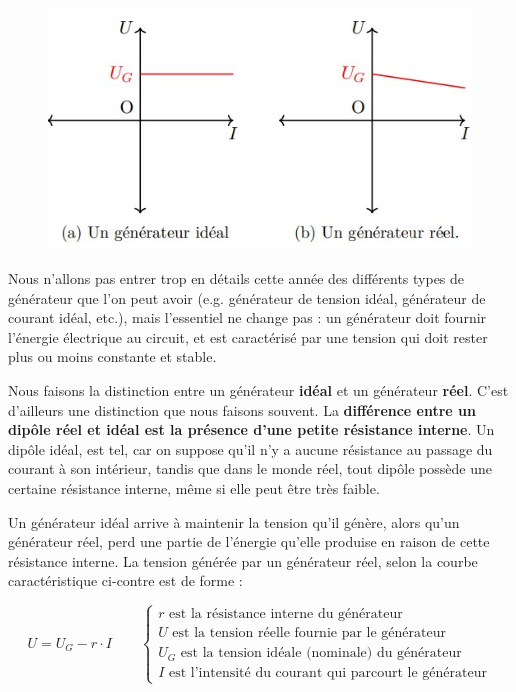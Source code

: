 \documentclass[11pt,a4paper]{article}
\begin{document}
\begin{figure}
\centering
    \includegraphics[width=0.95\linewidth]{imgs/p7/car2.jpg}
\end{figure}
Nous n'allons pas entrer trop en détails cette année des différents types de générateur que l'on peut avoir (e.g. générateur de tension idéal, générateur de courant idéal, etc.), mais l'essentiel ne change pas : un générateur doit fournir l'énergie électrique au circuit, et est caractérisé par une tension qui doit rester plus ou moins constante et stable. 


Nous faisons la distinction entre un générateur \textbf{idéal} et un générateur \textbf{réel}. C'est d'ailleurs une distinction que nous faisons souvent. La \textbf{différence entre un dipôle réel et idéal est la présence d'une petite résistance interne}. Un dipôle idéal, est tel, car on suppose qu'il n'y a aucune résistance au passage du courant à son intérieur, tandis que dans le monde réel, tout dipôle possède une certaine résistance interne, même si elle peut être très faible. 

\endgroup
Un générateur idéal arrive à maintenir la tension qu'il génère, alors qu'un générateur réel, perd une partie de l'énergie qu'elle produise en raison de cette résistance interne. La tension générée par un générateur réel, selon la courbe caractéristique ci-contre est de forme : 

\[ U = U_G - r\cdot I \quad \quad
\begin{cases}
r \text{ est la résistance interne du générateur}\\
U \text{ est la tension réelle fournie par le générateur}\\
U_G \text{ est la tension idéale (nominale) du générateur}\\
I \text{ est l'intensité du courant qui parcourt le générateur}
\end{cases}
\] 
 
\end{document}
